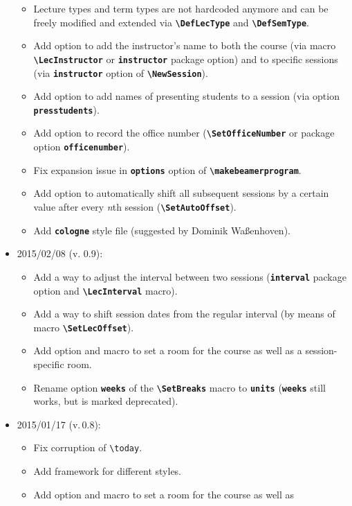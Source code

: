 \documentclass[english]{article}
\newcommand*\jmacro[1]{\textbf{\texttt{#1}}}
\newcommand*\jcsmacro[1]{\jmacro{\textbackslash{#1}}}
\newcommand*\joption[1]{\textbf{\texttt{#1}}}
\newcommand*\jfmacro[1]{\texttt{#1}}
\newcommand*\jfcsmacro[1]{\jfmacro{\textbackslash{#1}}}
\begin{document}
\begin{itemize}
\begin{itemize}
       \item Lecture types and term types are not hardcoded anymore and can be freely
             modified and extended via \jcsmacro{DefLecType} and \jcsmacro{DefSemType}.
       \item Add option to add the instructor's name to both the course (via macro
             \jcsmacro{LecInstructor} or \joption{instructor} package option) and
             to specific sessions (via \joption{instructor} option of
             \jcsmacro{NewSession}).
       \item Add option to add names of presenting students to a session (via option
             \joption{presstudents}).
       \item Add option to record the office number (\jcsmacro{SetOfficeNumber}
             or package option \joption{officenumber}).
       \item Fix expansion issue in \joption{options} option of \jcsmacro{makebeamerprogram}.
       \item Add option to automatically shift all subsequent sessions by a certain value
             after every \emph{n}th session (\jcsmacro{SetAutoOffset}).
       \item Add \joption{cologne} style file (suggested by Dominik Waßenhoven).
    \end{itemize}
\item 2015/02/08 (v. 0.9):
     \begin{itemize}
       \item Add a way to adjust the interval between two sessions
             (\joption{interval} package option and \jcsmacro{LecInterval} macro).
       \item Add a way to shift session dates from the regular interval
             (by means of macro \jcsmacro{SetLecOffset}).
       \item Add option and macro to set a room for the course as well as
             a session-specific room.
       \item Rename option \joption{weeks} of the \jcsmacro{SetBreaks} macro
             to \joption{units} (\joption{weeks} still works, but is marked deprecated).
    \end{itemize} 
\item 2015/01/17 (v.\,0.8):
    \begin{itemize}
       \item Fix corruption of \jfcsmacro{today}.
       \item Add framework for different styles.
       \item Add option and macro to set a room for the course as well as

\end{itemize}
\end{itemize}
\end{document}
